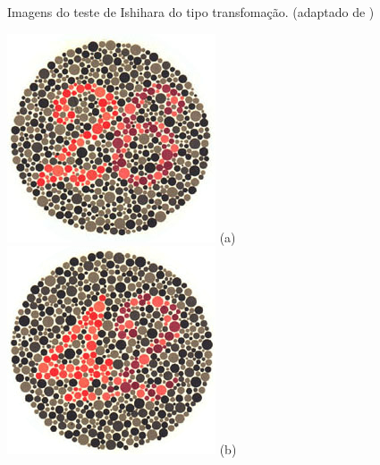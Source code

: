 \documentclass[	12pt, Times, openright, twoside, a4paper, english, brazil]{abntex2}
\begin{document}
\begin{apendicesenv}
\begin{figure}[!htb]
\caption{Imagens do teste de Ishihara do tipo transfomação. (adaptado de )}
\label{fig:apendiceTransformacao}

\end{figure}

\begin{figure}[!htb]
\centering
{\includegraphics[width=\linewidth]{ishihara-classificacao/plate22.jpg}}
(a)
\endminipage\hfill
{}
\centering
{\includegraphics[width=\linewidth]{ishihara-classificacao/plate23.jpg}}
(b)
\endminipage\hfill



\end{figure}
\end{apendicesenv}
\end{document}
